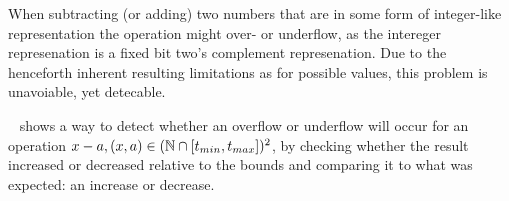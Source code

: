 When subtracting (or adding) two numbers that are in some form of integer-like representation the operation might over- or underflow, as the intereger represenation is a fixed bit two's complement represenation.
Due to the henceforth inherent resulting limitations as for possible values, this problem is unavoiable, yet detecable.

~\cite{pmg_2009} shows a way to detect whether an overflow or underflow will occur for an operation $x - a, (x, a) \in (\mathbb{N} \cap {\lbrack t_{min}, t_{max} \rbrack})^2$, by checking whether the result increased or decreased relative to the bounds and comparing it to what was expected: an increase or decrease.


